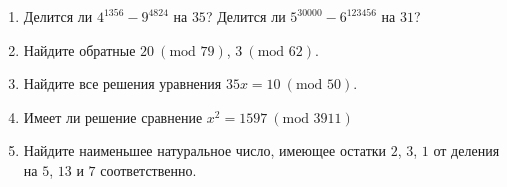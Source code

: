 \documentclass[a4paper,12pt]{article}
\begin{document}
\begin{task}
	\begin{enumerate}
	\item Делится ли $4^{1356}-9^{4824}$ на $35$? Делится ли $5^{30000} - 6^{123456}$ на $31$?
	
	\item Найдите обратные $20 \ (\mbox{mod } 79)$, $3 \ (\mbox{mod } 62)$.
	
	\item Найдите все решения уравнения $35x = 10 \ (\mbox{mod } 50)$.
	
	\item Имеет ли решение сравнение $x^2 = 1597 \ (\mbox{mod } 3911)$
	
	\item Найдите наименьшее натуральное число, имеющее остатки $2$, $3$, $1$ от деления на $5$, $13$ и $7$ соответственно.
	\end{enumerate}
\end{task}
\end{document}
